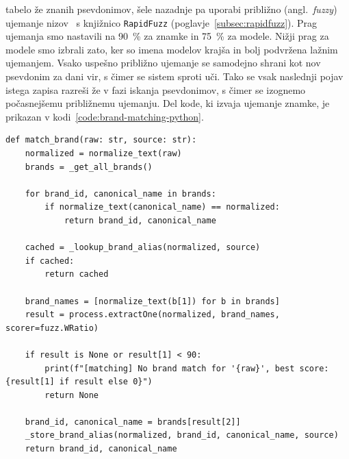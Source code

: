 \documentclass[a4paper,12pt,openright]{book}
\begin{document}
tabelo že znanih psevdonimov, šele nazadnje pa uporabi približno (angl.\ \emph{fuzzy}) ujemanje nizov~\cite{fuzzy-string-matching}
  s knjižnico \texttt{RapidFuzz} (poglavje~\ref{subsec:rapidfuzz}). Prag ujemanja smo nastavili na 90~\% za znamke in 75~\% za modele.
  Nižji prag za modele smo izbrali zato, ker so imena modelov krajša in bolj podvržena lažnim ujemanjem. Vsako uspešno približno ujemanje se samodejno shrani kot nov psevdonim za dani vir,
    s čimer se sistem sproti uči. Tako se vsak naslednji pojav istega zapisa razreši že v fazi iskanja psevdonimov, s čimer se izognemo počasnejšemu približnemu ujemanju. Del kode, ki izvaja ujemanje znamke, je prikazan v kodi~\ref{code:brand-matching-python}.

\begin{center}
\label{code:brand-matching-python}
\begin{verbatim}
def match_brand(raw: str, source: str):
    normalized = normalize_text(raw)
    brands = _get_all_brands()

    for brand_id, canonical_name in brands:
        if normalize_text(canonical_name) == normalized:
            return brand_id, canonical_name

    cached = _lookup_brand_alias(normalized, source)
    if cached:
        return cached

    brand_names = [normalize_text(b[1]) for b in brands]
    result = process.extractOne(normalized, brand_names, scorer=fuzz.WRatio)

    if result is None or result[1] < 90:
        print(f"[matching] No brand match for '{raw}', best score: {result[1] if result else 0}")
        return None

    brand_id, canonical_name = brands[result[2]]
    _store_brand_alias(normalized, brand_id, canonical_name, source)
    return brand_id, canonical_name
\end{verbatim}
\end{center}
\end{document}
